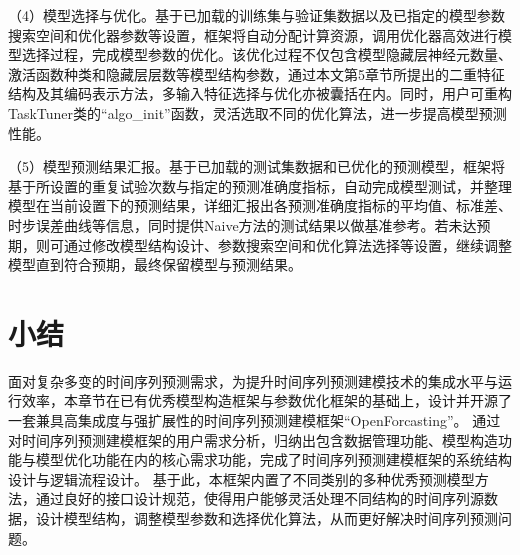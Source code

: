 （4）模型选择与优化。基于已加载的训练集与验证集数据以及已指定的模型参数搜索空间和优化器参数等设置，框架将自动分配计算资源，调用优化器高效进行模型选择过程，完成模型参数的优化。该优化过程不仅包含模型隐藏层神经元数量、激活函数种类和隐藏层层数等模型结构参数，通过本文第5章节所提出的二重特征结构及其编码表示方法，多输入特征选择与优化亦被囊括在内。同时，用户可重构TaskTuner类的“algo_init”函数，灵活选取不同的优化算法，进一步提高模型预测性能。

（5）模型预测结果汇报。基于已加载的测试集数据和已优化的预测模型，框架将基于所设置的重复试验次数与指定的预测准确度指标，自动完成模型测试，并整理模型在当前设置下的预测结果，详细汇报出各预测准确度指标的平均值、标准差、时步误差曲线等信息，同时提供Naive方法的测试结果以做基准参考。若未达预期，则可通过修改模型结构设计、参数搜索空间和优化算法选择等设置，继续调整模型直到符合预期，最终保留模型与预测结果。

\section{小结}
面对复杂多变的时间序列预测需求，为提升时间序列预测建模技术的集成水平与运行效率，本章节在已有优秀模型构造框架与参数优化框架的基础上，设计并开源了一套兼具高集成度与强扩展性的时间序列预测建模框架“OpenForcasting”。
通过对时间序列预测建模框架的用户需求分析，归纳出包含数据管理功能、模型构造功能与模型优化功能在内的核心需求功能，完成了时间序列预测建模框架的系统结构设计与逻辑流程设计。
基于此，本框架内置了不同类别的多种优秀预测模型方法，通过良好的接口设计规范，使得用户能够灵活处理不同结构的时间序列源数据，设计模型结构，调整模型参数和选择优化算法，从而更好解决时间序列预测问题。\cite{10.1145/3626202.3637578}\cite{yamaki_performance_2018}


